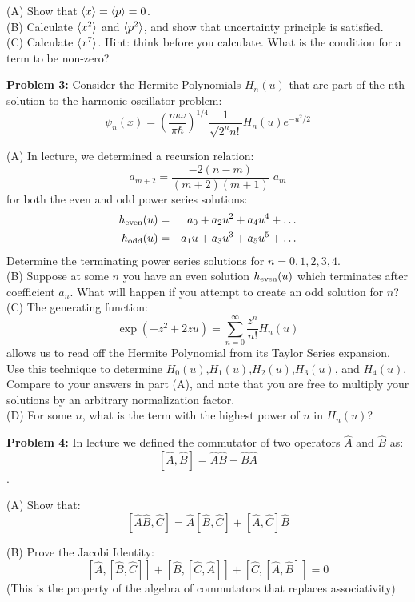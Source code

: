 \documentclass[12pt]{article}
\begin{document}
\noindent
(A) Show that $\braket{x} = \braket{p} = 0$.\\

\noindent  
(B) Calculate $\braket{x^2}$ and $\braket{p^2}$, and show that uncertainty principle is satisfied.\\

\noindent
(C) Calculate $\braket{x^7}$.  Hint:  think before you calculate.  What is the condition for a term to be non-zero?\\


\newpage

\noindent
{\bf Problem 3:} Consider the Hermite Polynomials $H_n(u)$ that are part of the nth solution to the harmonic oscillator problem:
$$\psi_n(x) = \left( \frac{m \omega}{\pi \hbar} \right)^{1/4} \frac{1}{\sqrt{2^n n!}}H_n(u) e^{-u^2/2}$$

\noindent
(A) In lecture, we determined a recursion relation:
$$a_{m+2} = \frac{-2(n-m)}{(m+2)(m+1)} \; a_m$$
for both the even and odd power series solutions:
\begin{eqnarray*}
h_{\rm even}(u)&=&a_0 + a_2 u^2 + a_4 u^4 + \ldots\\
h_{\rm odd}(u)&=&a_1 u + a_3 u^3 + a_5 u^5 + \ldots\\
\end{eqnarray*}
Determine the terminating power series solutions for $n=0,1,2,3,4$.\\

\noindent
(B)  Suppose at some $n$ you have an even solution $h_{\rm even}(u)$ which terminates after coefficient $a_n$.  What will happen if you attempt to create an odd solution for $n$?\\

\noindent
(C) The generating function:
$$\exp(-z^2+2zu) = \sum_{n=0}^{\infty} \frac{z^n}{n!}H_n(u)$$
allows us to read off the Hermite Polynomial from its Taylor Series expansion.  Use this technique to determine $H_0(u)$,$H_1(u)$,$H_2(u)$,$H_3(u)$, and $H_4(u)$. Compare to your answers in part (A), and note that you are free to multiply your solutions by an arbitrary normalization factor.\\

\noindent
(D) For some $n$, what is the term with the highest power of $n$ in $H_n(u)$?\\

\vskip 2cm

\noindent
{\bf Problem 4:} In lecture we defined the commutator of two operators $\hat{A}$ and $\hat{B}$ as:
$$[\hat{A}, \hat{B}] = \hat{A}\hat{B} - \hat{B}\hat{A}$$.

\noindent
(A) Show that:
$$ [\hat{A}\hat{B}, \hat{C}] = \hat{A}[\hat{B}, \hat{C}] + [\hat{A}, \hat{C}]\hat{B}$$

\noindent
(B) Prove the Jacobi Identity:
$$ [\hat{A},[\hat{B}, \hat{C}]] + [\hat{B},[\hat{C}, \hat{A}]] + [\hat{C},[\hat{A}, \hat{B}]] = 0$$
(This is the property of the algebra of commutators that replaces associativity)
\end{document}
